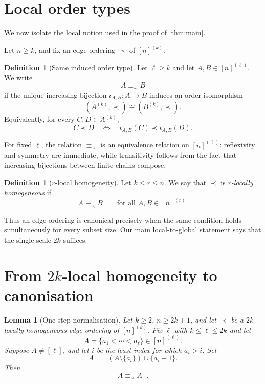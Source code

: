 \documentclass[11pt]{amsart}
\newtheorem{lemma}[theorem]{Lemma}
\theoremstyle{definition}
\newtheorem{definition}[theorem]{Definition}
\begin{document}
\section{Local order types}

We now isolate the local notion used in the proof of \cref{thm:main}.

Let $n\ge k$, and fix an edge-ordering $\prec$ of $[n]^{(k)}$.

\begin{definition}[Same induced order type]\label{def:equiv}
Let $\ell\ge k$ and let $A,B\in[n]^{(\ell)}$. We write
\[
A\equiv_{\prec} B
\]
if the unique increasing bijection $\iota_{A,B}:A\to B$ induces an order isomorphism
\[
(A^{(k)},\prec)\cong(B^{(k)},\prec).
\]
Equivalently, for every $C,D\in A^{(k)}$,
\[
C\prec D
\quad\Longleftrightarrow\quad
\iota_{A,B}(C)\prec \iota_{A,B}(D).
\]
\end{definition}

For fixed $\ell$, the relation $\equiv_{\prec}$ is an equivalence relation on $[n]^{(\ell)}$: reflexivity and symmetry are immediate, while transitivity follows from the fact that increasing bijections between finite chains compose.

\begin{definition}[$r$-local homogeneity]\label{def:localhom}
Let $k\le r\le n$. We say that $\prec$ is \emph{$r$-locally homogeneous} if
\[
A\equiv_{\prec} B
\qquad
\text{for all }A,B\in[n]^{(r)}.
\]
\end{definition}

Thus an edge-ordering is canonical precisely when the same condition holds simultaneously for every subset size. Our main local-to-global statement says that the single scale $2k$ suffices.

\section{From $2k$-local homogeneity to canonisation}

\begin{lemma}[One-step normalisation]\label{lem:onestep}
Let $k\ge2$, $n\ge2k+1$, and let $\prec$ be a $2k$-locally homogeneous edge-ordering of $[n]^{(k)}$. Fix $\ell$ with $k\le\ell\le2k$ and let
\[
A=\{a_1<\cdots<a_\ell\}\in[n]^{(\ell)}.
\]
Suppose $A\ne[\ell]$, and let $i$ be the least index for which $a_i>i$. Set
\[
A^-=(A\setminus\{a_i\})\cup\{a_i-1\}.
\]
Then
\[
A\equiv_{\prec}A^-.
\]
\end{lemma}
\end{document}
